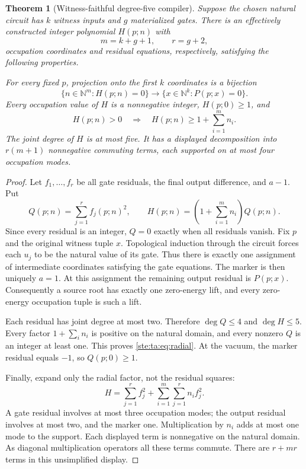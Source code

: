 \documentclass[11pt,letterpaper]{article}
\newtheorem{theorem}{Theorem}[section]
\theoremstyle{definition}
\theoremstyle{remark}
\newcommand{\N}{\mathbb N}
\begin{document}
\begin{theorem}[Witness-faithful degree-five compiler]\label{ste:ta:thm:compiler}
Suppose the chosen natural circuit has $k$ witness inputs and $g$ materialized gates. There is an effectively constructed integer polynomial $H(p;n)$ with
\begin{equation}\label{ste:ta:eq:ledger}
m=k+g+1,\qquad r=g+2,
\end{equation}
occupation coordinates and residual equations, respectively, satisfying the following properties.

For every fixed $p$, projection onto the first $k$ coordinates is a bijection
\[
\{n\in\N^m:H(p;n)=0\}
\longrightarrow
\{x\in\N^k:P(p;x)=0\}.
\]
Every occupation value of $H$ is a nonnegative integer, $H(p;0)\ge1$, and
\begin{equation}\label{ste:ta:eq:radial}
H(p;n)>0\quad\Longrightarrow\quad H(p;n)\ge1+\sum_{i=1}^m n_i.
\end{equation}
The joint degree of $H$ is at most five. It has a displayed decomposition into $r(m+1)$ nonnegative commuting terms, each supported on at most four occupation modes.
\end{theorem}
\begin{proof}
Let $f_1,\ldots,f_r$ be all gate residuals, the final output difference, and $a-1$. Put
\[
Q(p;n)=\sum_{j=1}^r f_j(p;n)^2,
\qquad H(p;n)=\left(1+\sum_{i=1}^m n_i\right)Q(p;n).
\]
Since every residual is an integer, $Q=0$ exactly when all residuals vanish. Fix $p$ and the original witness tuple $x$. Topological induction through the circuit forces each $u_j$ to be the natural value of its gate. Thus there is exactly one assignment of intermediate coordinates satisfying the gate equations. The marker is then uniquely $a=1$. At this assignment the remaining output residual is $P(p;x)$. Consequently a source root has exactly one zero-energy lift, and every zero-energy occupation tuple is such a lift.

Each residual has joint degree at most two. Therefore $\deg Q\le4$ and $\deg H\le5$. Every factor $1+\sum_i n_i$ is positive on the natural domain, and every nonzero $Q$ is an integer at least one. This proves \eqref{ste:ta:eq:radial}. At the vacuum, the marker residual equals $-1$, so $Q(p;0)\ge1$.

Finally, expand only the radial factor, not the residual squares:
\begin{equation}\label{ste:ta:eq:local}
H=\sum_{j=1}^r f_j^2+
\sum_{i=1}^m\sum_{j=1}^r n_i f_j^2.
\end{equation}
A gate residual involves at most three occupation modes; the output residual involves at most two, and the marker one. Multiplication by $n_i$ adds at most one mode to the support. Each displayed term is nonnegative on the natural domain. As diagonal multiplication operators all these terms commute. There are $r+mr$ terms in this unsimplified display.
\end{proof}
\end{document}
